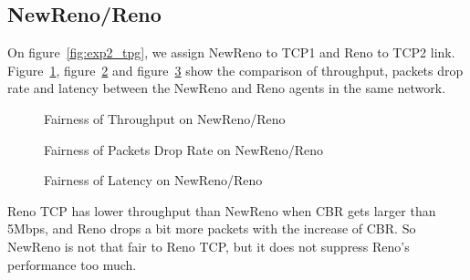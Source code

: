 \documentclass[10pt, conference]{lib/IEEEtran}
\begin{document}
\subsection{NewReno/Reno}
On figure~\ref{fig:exp2_tpg}, we assign NewReno to TCP1 and Reno to TCP2 link. Figure~\ref{fig:exp2_thp_nr}, 
figure~\ref{fig:exp2_dr_nr} and figure~\ref{fig:exp2_lt_nr} show the comparison of throughput, packets drop rate and 
latency between the NewReno and Reno agents in the same network.
\vspace{-0.2in}
\begin{figure}[H]
    \centering
    \resizebox{0.9\linewidth}{!}{}
    \caption{Fairness of Throughput on NewReno/Reno}
    \label{fig:exp2_thp_nr}
\end{figure}
\vspace{-0.3in}
\begin{figure}[H]
    \centering
    \resizebox{0.9\linewidth}{!}{}
    \caption{Fairness of Packets Drop Rate on NewReno/Reno}
    \label{fig:exp2_dr_nr}
\end{figure}
\vspace{-0.3in}
\begin{figure}[H]
    \centering
    \resizebox{0.9\linewidth}{!}{}
    \caption{Fairness of Latency on NewReno/Reno}
    \label{fig:exp2_lt_nr}
\end{figure}
Reno TCP has lower throughput than NewReno when CBR gets larger than 5Mbps, and Reno drops a bit more packets with the 
increase of CBR. So NewReno is not that fair to Reno TCP, but it does not suppress Reno's performance too much.
\end{document}
